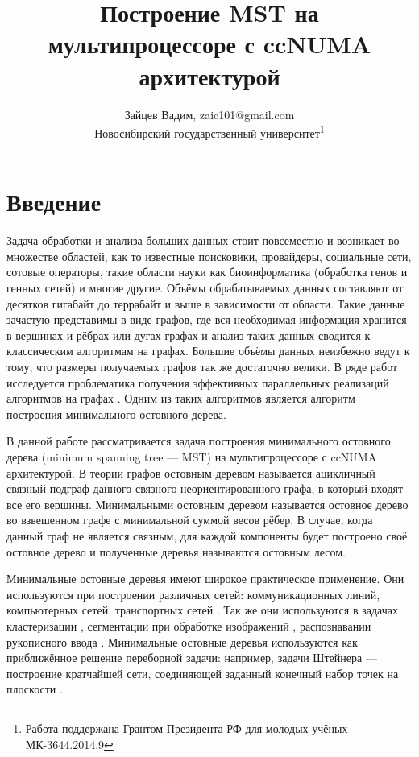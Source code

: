 \documentclass[a4paper,10pt]{extarticle}
\date{}
\title{Построение MST на мультипроцессоре с ccNUMA архитектурой}
\author{Зайцев Вадим, zaic101@gmail.com \\ Новосибирский государственный университет\thanks{Работа поддержана Грантом Президента РФ для молодых учёных МК-3644.2014.9}}
\begin{document}

\tableofcontents



\newpage
\section{Введение}
Задача обработки и анализа больших данных стоит повсеместно и возникает во множестве областей, как то известные поисковики, провайдеры, социальные сети, сотовые операторы, такие области науки как биоинформатика (обработка генов и генных сетей) \cite{graph-usage-bio} и многие другие.
Объёмы обрабатываемых данных составляют от десятков гигабайт до террабайт и выше в зависимости от области.
Такие данные зачастую представимы в виде графов, где вся необходимая информация хранится в вершинах и рёбрах или дугах графах и анализ таких данных сводится к классическим алгоритмам на графах.
Большие объёмы данных неизбежно ведут к тому, что размеры получаемых графов так же достаточно велики. В ряде работ исследуется проблематика получения эффективных параллельных реализаций алгоритмов на графах \cite{large-graph-0, large-graph-a, large-graph-b}.
Одним из таких алгоритмов является алгоритм построения минимального остовного дерева.

В данной работе рассматривается задача построения минимального остовного дерева (minimum spanning tree --- MST) на мультипроцессоре с ccNUMA архитектурой.
В теории графов остовным деревом называется ацикличный связный подграф данного связного неориентированного  графа, в который входят все его вершины. Минимальными остовным деревом называется остовное дерево во взвешенном графе с минимальной суммой весов рёбер.
В случае, когда данный граф не является связным, для каждой компоненты будет построено своё остовное дерево и полученные деревья называются остовным лесом.

Минимальные остовные деревья имеют широкое практическое применение.
Они используются при построении различных сетей: коммуникационных линий, компьютерных сетей, транспортных сетей \cite{mst-usage-network}.
Так же они используются в задачах кластеризации \cite{mst-usage-cluster}, сегментации при обработке изображений \cite{mst-usage-image}, распознавании рукописного ввода \cite{mst-usage-handwrite}.
Минимальные остовные деревья  используются как приближённое решение переборной задачи: например, задачи Штейнера --- построение кратчайшей сети, соединяющей заданный конечный набор точек на плоскости \cite{shtree}.
\end{document}
